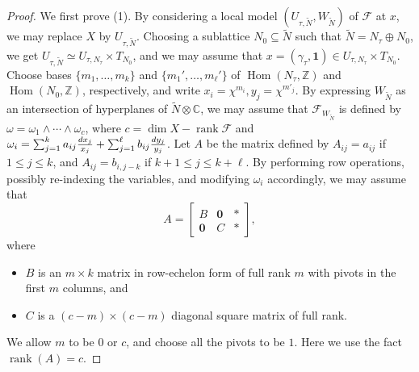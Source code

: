 \documentclass[10pt,a4paper]{amsart}
\newcommand\bC{{\mathbb C}}
\newcommand\bZ{{\mathbb Z}}
\newcommand\cF{{\mathcal{F}}}
\newcommand{\diff}{\textnormal{d}}
\newcommand{\on}{\operatorname}
\begin{document}
\begin{proof}
    We first prove (1). By considering a local model $(U_{\tau,\widetilde N},W_{\widetilde N})$ of $\cF$ at $x$, we may replace $X$ by $U_{\tau,\widetilde N}$. Choosing a sublattice $N_0\subseteq \widetilde N$ such that $\widetilde N=N_\tau\oplus N_0$, we get $U_{\tau,\widetilde N}\simeq U_{\tau,N_\tau}\times T_{N_0}$, and we may assume that $x=(\gamma_\tau,\mathbf 1)\in U_{\tau,N_\tau}\times T_{N_0}$. Choose bases $\{m_1,\ldots,m_k\}$ and $\{m_1',\ldots,m_\ell'\}$ of $\on{Hom} (N_\tau,\bZ)$ and $\on{Hom} (N_0,\bZ)$, respectively, and write $x_i=\chi^{m_i},y_j=\chi^{m'_j}$. By expressing $W_{\widetilde N}$ as an intersection of hyperplanes of $\widetilde N\otimes\bC$, we may assume that $\cF_{W_{\widetilde N}}$ is defined by $\omega=\omega_1\wedge\cdots\wedge\omega_c$, where $c=\dim X-\on{rank}\cF$ and $\omega_i=\sum_{j=1}^ka_{ij}\frac{\diff x_j}{x_j}+\sum_{j=1}^{\ell}b_{ij}\frac{\diff y_{j}}{y_{j}}$. Let $A$ be the matrix defined by $A_{ij}=a_{ij}$ if $1\leq j\leq k$, and $A_{ij}=b_{i,j-k}$ if $k+1\leq j\leq k+\ell$. By performing row operations, possibly re-indexing the variables, and modifying $\omega_i$ accordingly, we may assume that  
    \begin{equation}\tag{*}
        A =
        \begin{bmatrix}
        B & \textbf{0} & *\\
        \mathbf{0} & C & *
        \end{bmatrix},
    \end{equation}
    where
    \begin{itemize}
        \item  $B$ is an $ m \times k $ matrix in row-echelon form of full rank $m$ with pivots in the first $m$ columns, and
        \item  $C$ is a $(c-m) \times (c-m)$ diagonal square matrix of full rank.
    \end{itemize} 
    We allow $m$ to be $0$ or $c$, and choose all the pivots to be $1$.
    Here we use the fact $\on{rank}(A)=c$.
    

\end{proof}
\end{document}

